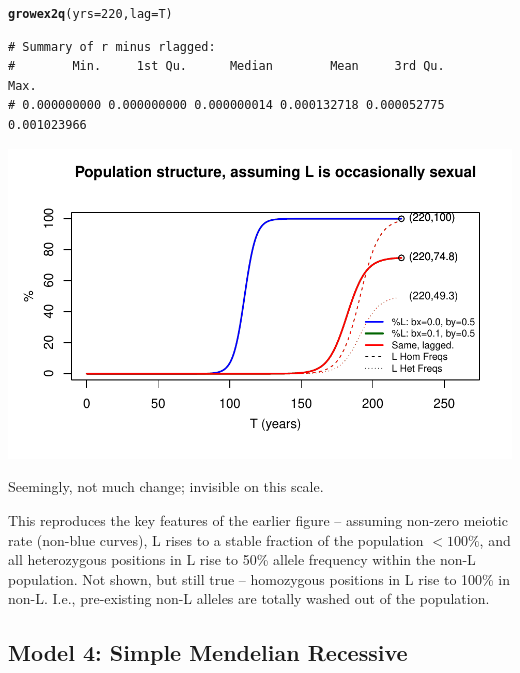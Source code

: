 \documentclass{article}\usepackage[]{graphicx}\usepackage[]{color}
\makeatletter
\def\maxwidth{ %
  \ifdim\Gin@nat@width>\linewidth
    \linewidth
  \else
    \Gin@nat@width
  \fi
}
\newcommand{\hlnum}[1]{\textcolor[rgb]{0.686,0.059,0.569}{#1}}%
\newcommand{\hlstd}[1]{\textcolor[rgb]{0.345,0.345,0.345}{#1}}%
\newcommand{\hlkwc}[1]{\textcolor[rgb]{0.333,0.667,0.333}{#1}}%
\newcommand{\hlkwd}[1]{\textcolor[rgb]{0.737,0.353,0.396}{\textbf{#1}}}%
\newenvironment{kframe}{%
 \def\at@end@of@kframe{}%
 \ifinner\ifhmode%
  \def\at@end@of@kframe{\end{minipage}}%
  \begin{minipage}{\columnwidth}%
 \fi\fi%
 \def\FrameCommand##1{\hskip\@totalleftmargin \hskip-\fboxsep
 \colorbox{shadecolor}{##1}\hskip-\fboxsep
     \hskip-\linewidth \hskip-\@totalleftmargin \hskip\columnwidth}%
 \MakeFramed {\advance\hsize-\width
   \@totalleftmargin\z@ \linewidth\hsize
   \@setminipage}}%
 {\par\unskip\endMakeFramed%
 \at@end@of@kframe}
\newenvironment{knitrout}{}{} %
\makeatother
\begin{document}
\begin{knitrout}\footnotesize
{}\color{fgcolor}\begin{kframe}
\begin{alltt}
\hlkwd{growex2q}\hlstd{(}\hlkwc{yrs}\hlstd{=}\hlnum{220}\hlstd{,} \hlkwc{lag}\hlstd{=T)}
\end{alltt}
\begin{verbatim}
# Summary of r minus rlagged:
#        Min.     1st Qu.      Median        Mean     3rd Qu.        Max. 
# 0.000000000 0.000000000 0.000000014 0.000132718 0.000052775 0.001023966
\end{verbatim}
\end{kframe}

{\centering \includegraphics[width=\maxwidth]{asex-figs-knitr/unnamed-chunk-19-1} 

}



\end{knitrout}

Seemingly, not much change; invisible on this scale.

This reproduces the key features of the earlier figure -- assuming non-zero meiotic rate (non-blue
curves), L rises to a stable fraction of the population $< 100\%$, and all heterozygous positions in
L rise to 50\% allele frequency within the non-L population.  Not shown, but still true --
homozygous positions in L rise to 100\% in non-L.  I.e., pre-existing non-L alleles are totally
washed out of the population.

\subsection{Model 4: Simple Mendelian Recessive}
\label{sec:smr}
\end{document}
